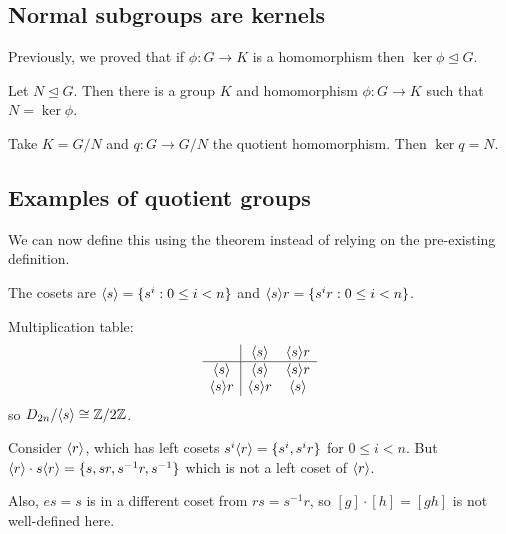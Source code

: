 \documentclass[12pt,letterpaper]{report}
\begin{document}
\pagebreak
\subsection{Normal subgroups are kernels}

Previously, we proved that if $\phi \colon G \to K$ is a homomorphism then
$\ker\phi \trianglelefteq G$.

\begin{cor}{}{}
  Let $N \trianglelefteq G$.
  Then there is a group $K$ and homomorphism $\phi \colon G \to K$ such that $N = \ker\phi$.
\end{cor}

\begin{thmproof}
  Take $K = G/N$ and $q \colon G \to G/N$ the quotient homomorphism.
  Then $\ker q = N$.
\end{thmproof}

\pagebreak
\subsection{Examples of quotient groups}

\begin{ex}
  We can now define this using the theorem instead of relying on the pre-existing definition.
\end{ex}

\begin{ex}
  The cosets are $\langle s\rangle = \{s^i : 0 \leq i < n\}$ and $\langle s\rangle r = \{s^ir : 0 \leq i < n\}$.

  Multiplication table:
  \[
    \begin{array}{c|cc}
      & \langle s\rangle & \langle s\rangle r \\
      \hline
      \langle s\rangle & \langle s\rangle & \langle s\rangle r \\
      \langle s\rangle r & \langle s\rangle r & \langle s\rangle
    \end{array}
  \]
  so $D_{2n}/\langle s\rangle \cong \mathbb{Z}/{2}\mathbb{Z}$.
\end{ex}

\begin{ex}
  Consider $\langle r\rangle$, which has left cosets $s^i\langle r\rangle = \{s^i, s^ir\}$ for $0 \leq i < n$.
  But $\langle r\rangle \cdot s\langle r\rangle = \{s, sr, s^{-1}r, s^{-1}\}$ which is not a left coset of $\langle r\rangle$.

  Also, $es = s$ is in a different coset from $rs = s^{-1}r$, so $[g] \cdot [h] = [gh]$ is not
  well-defined here.
\end{ex}
\end{document}
